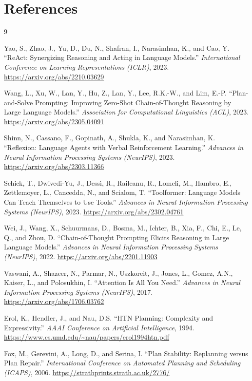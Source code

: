 \documentclass[11pt]{article}
\begin{document}
\section*{References}
\begingroup
\renewcommand{\section}[2]{}%
\begin{thebibliography}{9}

Yao, S., Zhao, J., Yu, D., Du, N., Shafran, I., Narasimhan, K., and Cao, Y.
``ReAct: Synergizing Reasoning and Acting in Language Models.''
\textit{International Conference on Learning Representations (ICLR)}, 2023.
\url{https://arxiv.org/abs/2210.03629}

Wang, L., Xu, W., Lan, Y., Hu, Z., Lan, Y., Lee, R.K.-W., and Lim, E.-P.
``Plan-and-Solve Prompting: Improving Zero-Shot Chain-of-Thought Reasoning by Large Language Models.''
\textit{Association for Computational Linguistics (ACL)}, 2023.
\url{https://arxiv.org/abs/2305.04091}

Shinn, N., Cassano, F., Gopinath, A., Shukla, K., and Narasimhan, K.
``Reflexion: Language Agents with Verbal Reinforcement Learning.''
\textit{Advances in Neural Information Processing Systems (NeurIPS)}, 2023.
\url{https://arxiv.org/abs/2303.11366}

Schick, T., Dwivedi-Yu, J., Dess\`{i}, R., Raileanu, R., Lomeli, M., Hambro, E., Zettlemoyer, L., Cancedda, N., and Scialom, T.
``Toolformer: Language Models Can Teach Themselves to Use Tools.''
\textit{Advances in Neural Information Processing Systems (NeurIPS)}, 2023.
\url{https://arxiv.org/abs/2302.04761}

Wei, J., Wang, X., Schuurmans, D., Bosma, M., Ichter, B., Xia, F., Chi, E., Le, Q., and Zhou, D.
``Chain-of-Thought Prompting Elicits Reasoning in Large Language Models.''
\textit{Advances in Neural Information Processing Systems (NeurIPS)}, 2022.
\url{https://arxiv.org/abs/2201.11903}

Vaswani, A., Shazeer, N., Parmar, N., Uszkoreit, J., Jones, L., Gomez, A.N., Kaiser, L., and Polosukhin, I.
``Attention Is All You Need.''
\textit{Advances in Neural Information Processing Systems (NeurIPS)}, 2017.
\url{https://arxiv.org/abs/1706.03762}

Erol, K., Hendler, J., and Nau, D.S.
``HTN Planning: Complexity and Expressivity.''
\textit{AAAI Conference on Artificial Intelligence}, 1994.
\url{https://www.cs.umd.edu/~nau/papers/erol1994htn.pdf}

Fox, M., Gerevini, A., Long, D., and Serina, I.
``Plan Stability: Replanning versus Plan Repair.''
\textit{International Conference on Automated Planning and Scheduling (ICAPS)}, 2006.
\url{https://strathprints.strath.ac.uk/2776/}

\end{thebibliography}
\endgroup
\end{document}
